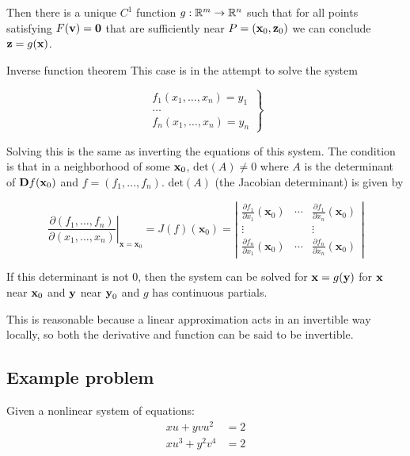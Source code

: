 Then there is a unique $C^1$ function $g:\mathbb{R}^m\to \mathbb{R}^n$ such that for all points satisfying $F(\textbf v)=\textbf 0$ that are sufficiently near $P=(\textbf x_0,\textbf z_0)$ we can conclude $\textbf z=g(\textbf x)$.

\begin{mybox}{Inverse function theorem}
    This case is in the attempt to solve the system 

    \[\left.\begin{array}{c}
        f_{1}\left(x_{1}, \ldots, x_{n}\right)=y_{1} \\
        \ldots \\
        f_{n}\left(x_{1}, \ldots, x_{n}\right)=y_{n}
    \end{array}\right\}\]

    Solving this is the same as inverting the equations of this system.
    The condition is that in a neighborhood of some $\textbf x_0$, $\mathrm{det}(A)\neq 0$
    where $A$ is the determinant of $\textbf Df(\textbf x_0)$ and $f=(f_1,\ldots,f_n)$. $\mathrm{det}(A)$
    (the Jacobian determinant) is given by 

    \[\left.\frac{\partial\left(f_{1}, \ldots, f_{n}\right)}{\partial\left(x_{1}, \ldots, x_{n}\right)}\right|_{\mathbf{x}=\mathbf{x}_{0}}=J(f)\left(\mathbf{x}_{0}\right)=\left|\begin{array}{ccc}
        \frac{\partial f_{1}}{\partial x_{1}}\left(\mathbf{x}_{0}\right) & \cdots & \frac{\partial f_{1}}{\partial x_{n}}\left(\mathbf{x}_{0}\right) \\
        \vdots & & \vdots \\
        \frac{\partial f_{n}}{\partial x_{1}}\left(\mathbf{x}_{0}\right) & \cdots & \frac{\partial f_{n}}{\partial x_{n}}\left(\mathbf{x}_{0}\right)
    \end{array}\right|\]

    If this determinant is not 0, then the system can be solved for $\textbf x=g(\textbf y)$ for $\textbf x$ near $\textbf x_0$ and $\textbf y$ near $\textbf y_0$ and $g$ has continuous partials.
\end{mybox}

This is reasonable because a linear approximation acts in an invertible way locally, so both the derivative and function can be said to be invertible.

\subsection{Example problem}

Given a nonlinear system of equations:
\begin{align*}
    xu+yvu^2&=2\\
    xu^3+y^2v^4&=2\\
\end{align*}

